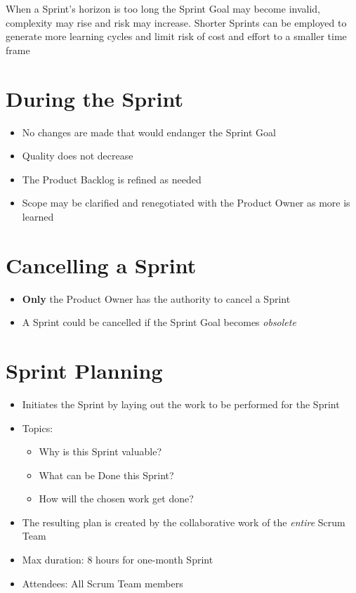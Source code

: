 \documentclass[a4paper,11pt,twocolumn]{article}
\begin{document}
\begin{tcolorbox}[colback=black!8!white,colframe=gray!50!black,title=Note,sharp corners,fonttitle=\normalsize\bfseries,fontupper=\normalsize,left=0.7em,right=0.7em]
	When a Sprint's horizon is too long the Sprint Goal may become invalid, complexity may rise and risk may increase. Shorter Sprints can be employed to generate more learning cycles and limit risk of cost and effort to a smaller time frame
\end{tcolorbox}

\section*{During the Sprint}
\begin{itemize}
	\item No changes are made that would endanger the Sprint Goal
	\item Quality does not decrease
	\item The Product Backlog is refined as needed
	\item Scope may be clarified and renegotiated with the Product Owner as more is learned
\end{itemize}

\section*{Cancelling a Sprint}
\begin{itemize}
	\item \textbf{Only} the Product Owner has the authority to cancel a Sprint
	\item A Sprint could be cancelled if the Sprint Goal becomes \textit{obsolete}
\end{itemize}

\section*{Sprint Planning}
\begin{itemize}
	\item Initiates the Sprint by laying out the work to be performed for the Sprint
	\item Topics:
	      \begin{itemize}
	      	\item Why is this Sprint valuable?
	      	\item What can be Done this Sprint?
	      	\item How will the chosen work get done?
	      \end{itemize}
	\item The resulting plan is created by the collaborative work of the \textit{entire} Scrum Team
	\item Max duration: 8 hours for one-month Sprint
	\item Attendees: All Scrum Team members
\end{itemize}
\end{document}
